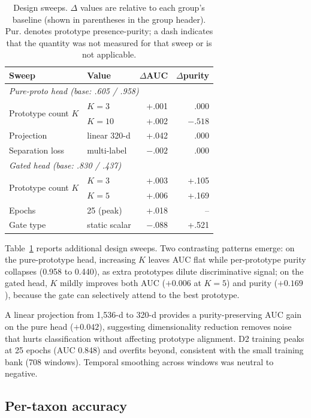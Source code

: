 \documentclass{ceurart}
\begin{document}
\begin{table}[t]
\caption{Design sweeps. $\Delta$ values are relative to each group's baseline (shown in parentheses in the group header). Pur. denotes prototype presence-purity; a dash indicates that the quantity was not measured for that sweep or is not applicable.}
\label{tab:sweeps}
\begin{tabular}{llrr}
\toprule
Sweep & Value & $\Delta$AUC & $\Delta$purity \\
\midrule
\multicolumn{4}{l}{\emph{Pure-proto head (base: .605 / .958)}} \\
\midrule
\multirow{2}{*}{Prototype count $K$}
  & $K{=}3$         & +.001 & .000 \\
  & $K{=}10$        & +.002 & $-.518$ \\
\midrule
Projection  & linear 320-d    & +.042 & .000 \\
\midrule
Separation loss  & multi-label     & $-.002$ & .000 \\
\midrule
\multicolumn{4}{l}{\emph{Gated head (base: .830 / .437)}} \\
\midrule
\multirow{2}{*}{Prototype count $K$}
  & $K{=}3$         & +.003 & +.105 \\
  & $K{=}5$         & +.006 & +.169 \\
\midrule
Epochs      & 25 (peak)       & +.018 & -- \\
\midrule
Gate type   & static scalar   & $-.088$ & +.521 \\
\bottomrule
\end{tabular}
\end{table}

Table~\ref{tab:sweeps} reports additional design sweeps.
Two contrasting patterns emerge:
on the pure-prototype head, increasing $K$ leaves AUC flat while per-prototype purity collapses (0.958 to 0.440), as extra prototypes dilute discriminative signal;
on the gated head, $K$ mildly improves both AUC ($+0.006$ at $K{=}5$) and purity ($+0.169$), because the gate can selectively attend to the best prototype.

A linear projection from 1,536-d to 320-d provides a purity-preserving AUC gain on the pure head ($+0.042$), suggesting dimensionality reduction removes noise that hurts classification without affecting prototype alignment.
D2 training peaks at 25 epochs (AUC 0.848) and overfits beyond, consistent with the small training bank (708 windows).
Temporal smoothing across windows was neutral to negative.

\subsection{Per-taxon accuracy}
\end{document}

